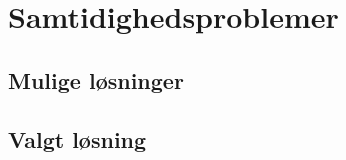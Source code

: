 \chapter{Samtidighedsproblemer}\label{ch:concurrency}

\section{Mulige løsninger}\label{sec:solutions}


\section{Valgt løsning}\label{sec:chosen_solution}

